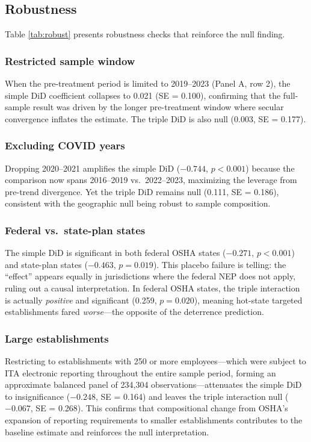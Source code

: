 \documentclass[12pt]{article}
\begin{document}
\subsection{Robustness}



Table \ref{tab:robust} presents robustness checks that reinforce the null finding.

\subsubsection*{Restricted sample window} When the pre-treatment period is limited to 2019--2023 (Panel A, row 2), the simple DiD coefficient collapses to 0.021 (SE = 0.100), confirming that the full-sample result was driven by the longer pre-treatment window where secular convergence inflates the estimate. The triple DiD is also null (0.003, SE = 0.177).

\subsubsection*{Excluding COVID years} Dropping 2020--2021 amplifies the simple DiD ($-0.744$, $p < 0.001$) because the comparison now spans 2016--2019 vs.\ 2022--2023, maximizing the leverage from pre-trend divergence. Yet the triple DiD remains null (0.111, SE = 0.186), consistent with the geographic null being robust to sample composition.

\subsubsection*{Federal vs.\ state-plan states} The simple DiD is significant in both federal OSHA states ($-0.271$, $p < 0.001$) and state-plan states ($-0.463$, $p = 0.019$). This placebo failure is telling: the ``effect'' appears equally in jurisdictions where the federal NEP does not apply, ruling out a causal interpretation. In federal OSHA states, the triple interaction is actually \textit{positive} and significant (0.259, $p = 0.020$), meaning hot-state targeted establishments fared \textit{worse}---the opposite of the deterrence prediction.

\subsubsection*{Large establishments} Restricting to establishments with 250 or more employees---which were subject to ITA electronic reporting throughout the entire sample period, forming an approximate balanced panel of 234,304 observations---attenuates the simple DiD to insignificance ($-0.248$, SE = 0.164) and leaves the triple interaction null ($-0.067$, SE = 0.268). This confirms that compositional change from OSHA's expansion of reporting requirements to smaller establishments contributes to the baseline estimate and reinforces the null interpretation.
\end{document}
